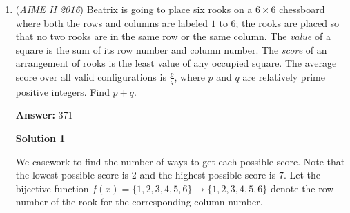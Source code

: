 \begin{enumerate}
 Using generating functions, this equates to finding the sum of the coefficients of the terms whose exponents are multiples of $n$ of the function:
 \[f(x)=(x+x^2+\cdots+x^{n-1})^m=\sum_{k=m}^{(n-1)m}a_k x^k\]Let $\omega=e^{i\frac{2\pi}{n}}$. Note that for $n\nmid k\implies \omega^k\neq 1$, the sum
 \[S_k=1+\omega^{k}+\omega^{2k}+\ldots+\omega^{(n-1)k}=\sum_{i=0}^{n-1}(\omega^k)^{i}=\frac{\omega^{nk}-1}{\omega^k -1}=0\]When $n\mid k$, we always have $\omega^k=1$. The same sum evaluates to 
 \[S_k=1+\omega^{k}+\omega^2+\ldots+\omega^{(n-1)k}=\sum_{i=0}^{n-1}1=n\]It follows that
 \[\sum_{k=0}^{n-1}f(\omega^{k})=\sum_{k=m}^{(n-1)m}S_k\cdot a_k=n\sum_{n\mid k}a_k\]Therefore, we want
 \[\sum_{n\mid k}a_k=\frac{f(1)+f(\omega)+\ldots +f(\omega^{n-1})}{n}=\frac{(n-1)^m+f(\omega)+f(\omega^2)+\ldots +f(\omega^{n-1})}{n}\]For any $k\in\{1,2,\ldots, n-1\}$, the result of the sum
 \[\omega^k+\omega^{2k}+\ldots +\omega^{(n-1)k}=\omega^k\cdot\frac{1-\omega^{(n-1)k}}{1-\omega^k}=\frac{\omega^k -1}{1-\omega^k}=-1\]implies that our desired sum of coefficients evaluates to
 \[\sum_{n\mid k}a_k=\frac{(n-1)^m +(n-1)(-1)^m}{n}\]However, we realize that one valid sequence $\{d_i\}$ only specifies the relative order of the way to assign the colors. We need to multiply the sum by $n$ to ensure we obtain all available ways for coloring.

 Thus, the number of ways to color $m$ sections using $n$ different colors where no adjacent sections have the same color is
 \[(n-1)^m+(n-1)(-1)^m\]Plug-in $m=6, n=4$ gives $3^6+3=\boxed{732}$, as desired.

 


	\item (\textit{AIME II 2016}) Beatrix is going to place six rooks on a $6 \times 6$ chessboard where both the rows and columns are labeled $1$ to $6$; the rooks are placed so that no two rooks are in the same row or the same column. The \textit{value} of a square is the sum of its row number and column number. The \textit{score} of an arrangement of rooks is the least value of any occupied square. The average score over all valid configurations is $\frac{p}{q}$, where $p$ and $q$ are relatively prime positive integers. Find $p+q$.


 
 \textbf{Answer: }371



\textbf{Solution 1}

We casework to find the number of ways to get each possible score. Note that the lowest possible score is $2$ and the highest possible score is $7$. Let the bijective function $f(x)=\{1,2,3,4,5,6\} \to \{1,2,3,4,5,6\}$ denote the row number of the rook for the corresponding column number.


\end{enumerate}
